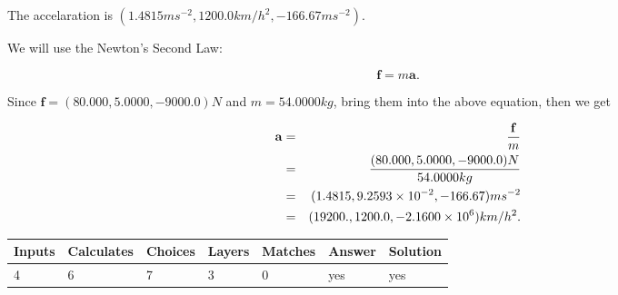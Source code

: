 \documentclass[12pt]{article}
\begin{document}
 
\noindent{}
 
 
The accelaration is
$(
1.4815ms^{-2},
1200.0km/h^2,
-166.67ms^{-2}
).
$
 
 
\noindent{}
 
 
 
 
 
 
\noindent{}
 
 

We will use the Newton's Second Law:
 
\[
\mathbf{f}=m\mathbf{a}.
\]
 
Since $\mathbf{f}=( %
80.000,  %
5.0000,  %
-9000.0 )N$
and $m= %
54.0000kg$, bring them into the above equation, then we get
 
\begin{eqnarray*}
\mathbf{a}&=&\frac{\mathbf{f}}m  \\
&=&\frac{(
80.000 ,
5.0000 ,
-9000.0 )N
}{ %
54.0000 kg}  \\
&=&(
1.4815 ,
9.2593 \times 10^{-2},
-166.67
)ms^{-2} \\
&=&(
19200. ,
1200.0 ,
-2.1600 \times 10^{6}
)km/h^2.
\end{eqnarray*}
 
 
 
\noindent{}
 
 

 
\vspace{0.3in}
   
   
   
   
\noindent\begin{tabular}{|l|l|l|l|l|l|l|}
 \hline
Inputs & Calculates & Choices & Layers & Matches & Answer & Solution \\ \hline
           4 & 
           6 & 
           7
  & 
           3 & 
           0 & 
  yes & 
  yes 
  \\ \hline
 \end{tabular}
   
   
   
   
\noindent{}
   
   
  
\end{document}
